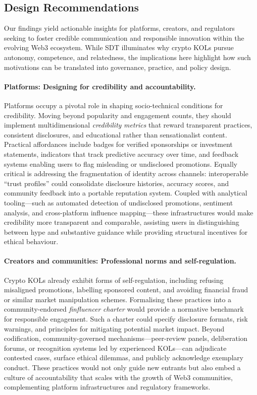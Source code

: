 \subsection{Design Recommendations}

Our findings yield actionable insights for platforms, creators, and regulators seeking to foster credible communication and responsible innovation within the evolving Web3 ecosystem. While SDT illuminates why crypto KOLs pursue autonomy, competence, and relatedness, the implications here highlight how such motivations can be translated into governance, practice, and policy design.

\paragraph{Platforms: Designing for credibility and accountability.}
Platforms occupy a pivotal role in shaping socio-technical conditions for credibility. Moving beyond popularity and engagement counts, they should implement multidimensional \emph{credibility metrics} that reward transparent practices, consistent disclosures, and educational rather than sensationalist content. Practical affordances include badges for verified sponsorships or investment statements, indicators that track predictive accuracy over time, and feedback systems enabling users to flag misleading or undisclosed promotions. Equally critical is addressing the fragmentation of identity across channels: interoperable “trust profiles” could consolidate disclosure histories, accuracy scores, and community feedback into a portable reputation system. Coupled with analytical tooling—such as automated detection of undisclosed promotions, sentiment analysis, and cross-platform influence mapping—these infrastructures would make credibility more transparent and comparable, assisting users in distinguishing between hype and substantive guidance while providing structural incentives for ethical behaviour.

\paragraph{Creators and communities: Professional norms and self-regulation.}
Crypto KOLs already exhibit forms of self-regulation, including refusing misaligned promotions, labelling sponsored content, and avoiding financial fraud or similar market manipulation schemes. Formalising these practices into a community-endorsed \emph{finfluencer charter} would provide a normative benchmark for responsible engagement. Such a charter could specify disclosure formats, risk warnings, and principles for mitigating potential market impact. Beyond codification, community-governed mechanisms—peer-review panels, deliberation forums, or recognition systems led by experienced KOLs—can adjudicate contested cases, surface ethical dilemmas, and publicly acknowledge exemplary conduct. These practices would not only guide new entrants but also embed a culture of accountability that scales with the growth of Web3 communities, complementing platform infrastructures and regulatory frameworks.

